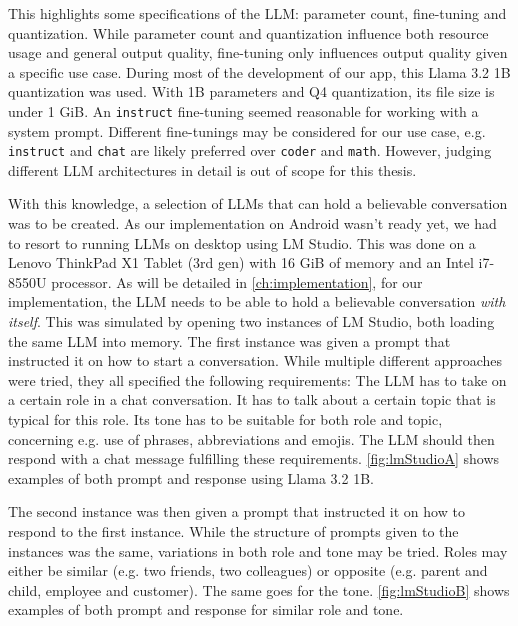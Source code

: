 This highlights some specifications of the \gls{LLM}: parameter count, fine-tuning and quantization. While parameter count and quantization influence both resource usage and general output quality, fine-tuning only influences output quality given a specific use case. During most of the development of our app, this Llama 3.2 1B quantization was used. With 1B parameters and Q4 quantization, its file size is under 1 GiB. An \lstinline|instruct| fine-tuning seemed reasonable for working with a system prompt. Different fine-tunings may be considered for our use case, e.g. \lstinline|instruct| and \lstinline|chat| are likely preferred over \lstinline|coder| and \lstinline|math|. However, judging different \gls{LLM} architectures in detail is out of scope for this thesis.

With this knowledge, a selection of \glspl{LLM} that can hold a believable conversation was to be created. As our implementation on Android wasn't ready yet, we had to resort to running \glspl{LLM} on desktop using LM Studio. This was done on a Lenovo ThinkPad X1 Tablet (3rd gen) with 16 GiB of memory and an Intel i7-8550U processor. As will be detailed in \cref{ch:implementation}, for our implementation, the \gls{LLM} needs to be able to hold a believable conversation \textit{with itself}. This was simulated by opening two instances of LM Studio, both loading the same \gls{LLM} into memory. The first instance was given a prompt that instructed it on how to start a conversation. While multiple different approaches were tried, they all specified the following requirements: The \gls{LLM} has to take on a certain role in a chat conversation. It has to talk about a certain topic that is typical for this role. Its tone has to be suitable for both role and topic, concerning e.g. use of phrases, abbreviations and emojis. The \gls{LLM} should then respond with a chat message fulfilling these requirements. \cref{fig:lmStudioA} shows examples of both prompt and response using Llama 3.2 1B.

The second instance was then given a prompt that instructed it on how to respond to the first instance. While the structure of prompts given to the instances was the same, variations in both role and tone may be tried. Roles may either be similar (e.g. two friends, two colleagues) or opposite (e.g. parent and child, employee and customer). The same goes for the tone. \cref{fig:lmStudioB} shows examples of both prompt and response for similar role and tone.

